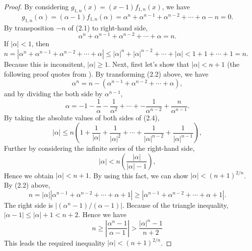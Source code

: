 \documentclass{article}
\begin{document}
\begin{proof}
By considering $g_{1,n}(x)=(x-1)f_{1,n}(x)$, we have
\begin{equation}
g_{1,n}(\alpha)=(\alpha-1)f_{1,n}(\alpha)=\alpha^{n} + \alpha^{n-1} + \alpha^{n-2} + \cdots + \alpha - n=0.
\end{equation}
By transposition $-n$ of (2.1) to right-hand side,
\begin{equation}
\alpha^{n} + \alpha^{n-1} + \alpha^{n-2} + \cdots + \alpha=n.
\end{equation}
If $|\alpha|<1$, then $n=|\alpha^{n} + \alpha^{n-1} + \alpha^{n-2} + \cdots + \alpha|\leq |\alpha|^{n}+|\alpha|^{n-2} + \cdots + |\alpha|<1+1+\cdots+1=n$. Because this is inconsitent, $|\alpha|\geq 1$. Next, first let's show that $|\alpha|<n+1$ (the following proof quotes from  \cite{Takagi}). By transforming (2.2) above, we have
\begin{equation}
\alpha^{n} =n-(\alpha^{n-1} + \alpha^{n-2} + \cdots + \alpha),
\end{equation}
and by dividing the both side by $\alpha^{n-1}$,
\begin{equation}
\alpha =-1-\frac{1}{\alpha} - \frac{1}{\alpha^{2}} + \cdots + -\frac{1}{\alpha^{n-2}}+\frac{n}{\alpha^{n-1}}.
\end{equation}
By taking the absolute values of both sides of (2.4),
\begin{equation}
|\alpha| \leq n(1+\frac{1}{|\alpha|} + \frac{1}{|\alpha|^{2}} + \cdots + \frac{1}{|\alpha|^{n-2}}+\frac{1}{|\alpha|^{n-1}}),
\end{equation}
Further by considering the infinite series of the right-hand side,
\begin{equation}
|\alpha| < n(\frac{|\alpha|}{|\alpha|-1}),
\end{equation}
Hence we obtain $|\alpha|<n+1$. By using this fact, we can show $|\alpha|<(n+1)^{2/n}$.\\
By (2.2) above,
\begin{equation}
n=|\alpha||\alpha^{n-1} + \alpha^{n-2} + \cdots + \alpha+1|\geq |\alpha^{n-1} + \alpha^{n-2} + \cdots + \alpha+1|.
\end{equation}
The right side is $|(\alpha^{n}-1)/(\alpha-1)|$. Because of the triangle inequality, $|\alpha-1|\leq|\alpha|+1<n+2$. Hence we have
\begin{equation}
n\geq|\frac{\alpha^{n}-1}{\alpha-1}|>\frac{|\alpha|^{n}-1}{n+2}
\end{equation}
This leads the required inequality $|\alpha|<(n+1)^{2/n}$.
\end{proof}
\end{document}
